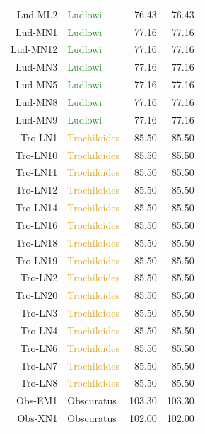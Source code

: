 \documentclass[10pt,letterpaper]{article}
\begin{document}
\begin{table}
\begin{tabular}{rlrr}
   Lud-ML2 & \textcolor{ForestGreen}{Ludlowi} & 76.43 & 76.43 \\ 
   Lud-MN1 & \textcolor{ForestGreen}{Ludlowi} & 77.16 & 77.16 \\ 
   Lud-MN12 & \textcolor{ForestGreen}{Ludlowi} & 77.16 & 77.16 \\ 
   Lud-MN3 & \textcolor{ForestGreen}{Ludlowi} & 77.16 & 77.16 \\ 
   Lud-MN5 & \textcolor{ForestGreen}{Ludlowi} & 77.16 & 77.16 \\ 
   Lud-MN8 & \textcolor{ForestGreen}{Ludlowi} & 77.16 & 77.16 \\ 
   Lud-MN9 & \textcolor{ForestGreen}{Ludlowi} & 77.16 & 77.16 \\ 
      \hline
   Tro-LN1 & \textcolor{Goldenrod}{Trochiloides} & 85.50 & 85.50 \\ 
   Tro-LN10 & \textcolor{Goldenrod}{Trochiloides} & 85.50 & 85.50 \\ 
   Tro-LN11 & \textcolor{Goldenrod}{Trochiloides} & 85.50 & 85.50 \\ 
   Tro-LN12 & \textcolor{Goldenrod}{Trochiloides} & 85.50 & 85.50 \\ 
   Tro-LN14 & \textcolor{Goldenrod}{Trochiloides} & 85.50 & 85.50 \\ 
   Tro-LN16 & \textcolor{Goldenrod}{Trochiloides} & 85.50 & 85.50 \\ 
   Tro-LN18 & \textcolor{Goldenrod}{Trochiloides} & 85.50 & 85.50 \\ 
   Tro-LN19 & \textcolor{Goldenrod}{Trochiloides} & 85.50 & 85.50 \\ 
   Tro-LN2 & \textcolor{Goldenrod}{Trochiloides} & 85.50 & 85.50 \\ 
   Tro-LN20 & \textcolor{Goldenrod}{Trochiloides} & 85.50 & 85.50 \\ 
   Tro-LN3 & \textcolor{Goldenrod}{Trochiloides} & 85.50 & 85.50 \\ 
   Tro-LN4 & \textcolor{Goldenrod}{Trochiloides} & 85.50 & 85.50 \\ 
   Tro-LN6 & \textcolor{Goldenrod}{Trochiloides} & 85.50 & 85.50 \\ 
   Tro-LN7 & \textcolor{Goldenrod}{Trochiloides} & 85.50 & 85.50 \\ 
   Tro-LN8 & \textcolor{Goldenrod}{Trochiloides} & 85.50 & 85.50 \\ 
      \hline
   Obs-EM1 & \textcolor{BurntOrange}{Obscuratus} & 103.30 & 103.30 \\ 
   Obs-XN1 & \textcolor{BurntOrange}{Obscuratus} & 102.00 & 102.00 \\ 

\end{tabular}
\end{table}
\end{document}
